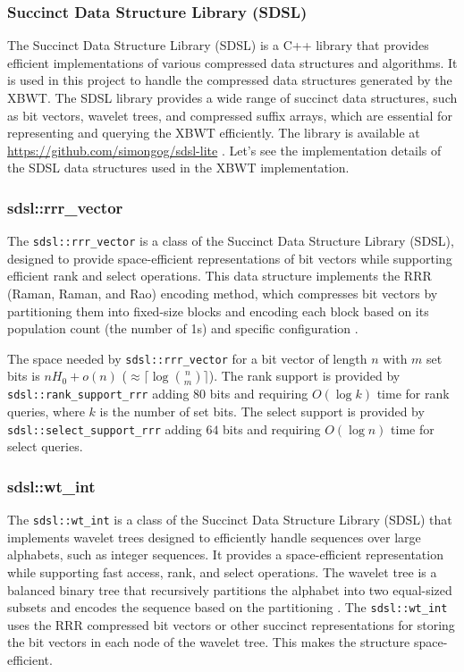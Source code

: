 \subsubsection{Succinct Data Structure Library (SDSL)}
The Succinct Data Structure Library (SDSL) is a C++ library that provides efficient implementations of various compressed data structures and algorithms. It is used in this project to handle the compressed data structures generated by the XBWT. The SDSL library provides a wide range of succinct data structures, such as bit vectors, wavelet trees, and compressed suffix arrays, which are essential for representing and querying the XBWT efficiently. The library is available at \url{https://github.com/simongog/sdsl-lite} \cite{gbmp2014sea}. Let's see the implementation details of the SDSL data structures used in the XBWT implementation.

\subsubsection{sdsl::rrr\_vector}
The \texttt{sdsl::rrr\_vector} is a class of the Succinct Data Structure Library (SDSL), designed to provide space-efficient representations of bit vectors while supporting efficient rank and select operations. This data structure implements the RRR (Raman, Raman, and Rao) encoding method, which compresses bit vectors by partitioning them into fixed-size blocks and encoding each block based on its population count (the number of 1s) and specific configuration \cite{raman2002succinct}.

The space needed by \texttt{sdsl::rrr\_vector} for a bit vector of length $n$ with $m$ set bits is $nH_0 + o(n)$ ($\approx \lceil \log \binom{n}{m} \rceil$). The rank support is provided by \texttt{sdsl::rank\_support\_rrr} adding $80$ bits and requiring $O(\log k)$ time for rank queries, where $k$ is the number of set bits. The select support is provided by \texttt{sdsl::select\_support\_rrr} adding $64$ bits and requiring $O(\log n)$ time for select queries.

\subsubsection{sdsl::wt\_int}
The \texttt{sdsl::wt\_int} is a class of the Succinct Data Structure Library (SDSL) that implements wavelet trees designed to efficiently handle sequences over large alphabets, such as integer sequences. It provides a space-efficient representation while supporting fast access, rank, and select operations. The wavelet tree is a balanced binary tree that recursively partitions the alphabet into two equal-sized subsets and encodes the sequence based on the partitioning \cite{grossi2003high}. The \texttt{sdsl::wt\_int} uses the RRR compressed bit vectors or other succinct representations for storing the bit vectors in each node of the wavelet tree.
This makes the structure space-efficient.

